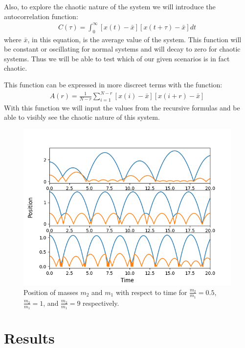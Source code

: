 \documentclass[pra,twocolumn,showpacs,amsmath,amssymb]{revtex4-2}
\begin{document}
Also, to explore the chaotic nature of the system we will introduce the autocorrelation function:
\begin{eqnarray}
C(\tau) = \int_{0}^{\infty} [x(t) - \bar{x}][x(t + \tau) - \bar{x}]dt
\end{eqnarray}
where \(\bar{x}\), in this equation, is the average value of the system. This function will be constant or oscillating for normal systems and will decay to zero for chaotic systems. Thus we will be able to test which of our given scenarios is in fact chaotic.
\par This function can be expressed in more discreet terms with the function: 
\begin{eqnarray}
A(r) = \frac{1}{N-r} \sum_{i=1}^{N-r} [x(i) - \bar{x}][x(i + r) - \bar{x}]
\end{eqnarray}
With this function we will input the values from the recursive formulas and be able to visibly see the chaotic nature of this system.

\begin{figure}[t!]
\includegraphics[scale=0.50]{x.png}
\caption{Position of masses $m_2$ and $m_1$ with respect to time for \(\frac{m_2}{m_1} = 0.5\), \(\frac{m_2}{m_1} = 1\), and \(\frac{m_2}{m_1} = 9\) respectively.}\label{position}
\end{figure}

\section{Results} \label{sec:results}
\end{document}
